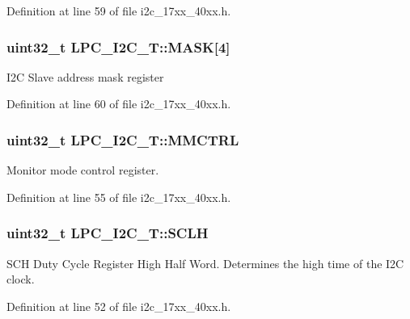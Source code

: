 Definition at line 59 of file i2c\+\_\+17xx\+\_\+40xx.\+h.

\subsubsection[{\texorpdfstring{M\+A\+SK}{MASK}}]{ uint32\+\_\+t L\+P\+C\+\_\+\+I2\+C\+\_\+\+T\+::\+M\+A\+SK\mbox{[}4\mbox{]}}\hypertarget{structLPC__I2C__T_a9e734d7a24b7a02ac1887608552b9c69}{}\label{structLPC__I2C__T_a9e734d7a24b7a02ac1887608552b9c69}
I2C Slave address mask register 

Definition at line 60 of file i2c\+\_\+17xx\+\_\+40xx.\+h.

\subsubsection[{\texorpdfstring{M\+M\+C\+T\+RL}{MMCTRL}}]{ uint32\+\_\+t L\+P\+C\+\_\+\+I2\+C\+\_\+\+T\+::\+M\+M\+C\+T\+RL}\hypertarget{structLPC__I2C__T_ace2d21c2a5042f1355f98b2e687ae8c1}{}\label{structLPC__I2C__T_ace2d21c2a5042f1355f98b2e687ae8c1}
Monitor mode control register. 

Definition at line 55 of file i2c\+\_\+17xx\+\_\+40xx.\+h.

\subsubsection[{\texorpdfstring{S\+C\+LH}{SCLH}}]{ uint32\+\_\+t L\+P\+C\+\_\+\+I2\+C\+\_\+\+T\+::\+S\+C\+LH}\hypertarget{structLPC__I2C__T_a73be20e257e178ea0deafd0057cc7900}{}\label{structLPC__I2C__T_a73be20e257e178ea0deafd0057cc7900}
S\+CH Duty Cycle Register High Half Word. Determines the high time of the I2C clock. 

Definition at line 52 of file i2c\+\_\+17xx\+\_\+40xx.\+h.

